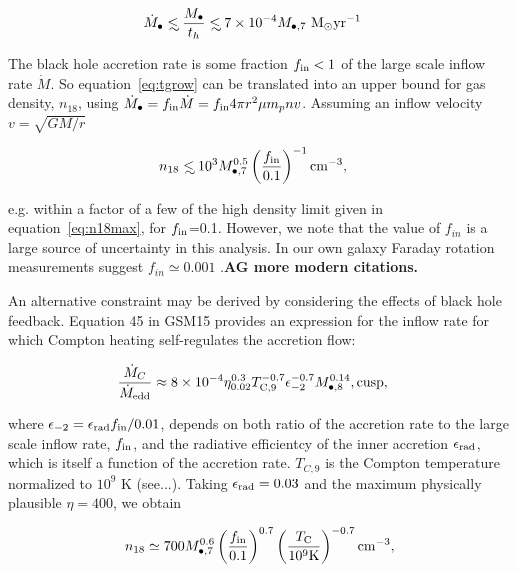 \documentclass[usenatbib,fleqn]{mnras}
\newcommand\lsim{\mathrel{\rlap{\lower4pt\hbox{\hskip1pt$\sim$}}
    \raise1pt\hbox{$<$}}}
\newcommand{\Mbh}[1][]{M_{\bullet#1}}
\newcommand{\Msun}{{\rm M_\odot}}
\newcommand{\pyear}{{\rm yr}^{-1}}
\begin{document}
\begin{align}
\dot{M}_{\bullet} &\lsim \frac{\Mbh}{t_h} \lsim 7 \times 10^{-4}
\Mbh[,7] \,\, \Msun \pyear
\label{eq:tgrow}
\end{align}

The black hole accretion rate is some fraction $f_{\rm in}<1$ of the
large scale inflow rate $\dot{M}$. So equation~\eqref{eq:tgrow} can be
translated into an upper bound for gas density, $n_{18}$, using
$\dot{M}_{\bullet} = f_{\rm in} \dot{M} = f_{\rm in} 4 \pi r^2 \mu m_p
n v$.  Assuming an inflow velocity $v=\sqrt{G M/r}$ 

\begin{align}
n_{18} &\lsim 10^3 \Mbh[,7]^{0.5} \left(\frac{f_{\rm in}}{0.1}\right)^{-1}
{\rm cm^{-3}}, 
\label{eq:tgrowDens}
\end{align}

e.g. within a factor of a few of the high density limit given in
equation~\eqref{eq:n18max}, for $f_{\rm in}$=0.1. However, we note
that the value of $f_{in}$ is a large source of uncertainty in this
analysis. In our own galaxy Faraday rotation measurements suggest
$f_{in}\simeq 0.001$ \citep{Quataert+2000}.{\bf AG more modern citations.}

An alternative constraint may be derived by considering the effects of
black hole feedback. Equation 45 in GSM15 provides an expression for
the inflow rate for which Compton heating self-regulates the accretion
flow:

\begin{align}
\frac{\dot{M}_{C}}{\dot{M}_{\rm edd}} \approx 
8\times 10^{-4} \eta_{0.02}^{0.3}T_{\rm
C,9}^{-0.7}\epsilon_{-2}^{-0.7} M_{\bullet,8}^{0.14}
&, \text{cusp}, 
  \label{eq:MdotCa}
\end{align}

where $\epsilon_{-2}=\epsilon_{\rm rad} f_{\rm in}/0.01$, depends on
both ratio of the accretion rate to the large scale inflow rate,
$f_{\rm in}$, and the radiative efficientcy of the inner accretion
$\epsilon_{\rm rad}$, which is itself a function of the accretion
rate. $T_{C,9}$ is the Compton temperature normalized to $10^9$
K (see...). Taking $\epsilon_{\rm rad}=0.03$ and the maximum physically
plausible $\eta=400$, we obtain

\begin{align}
n_{18} \simeq 700 \Mbh[,7]^{0.6} \left(\frac{f_{\rm
      in}}{0.1}\right)^{0.7} \left(\frac{T_{\rm C}}{10^9 {\rm
      K}}\right)^{-0.7} {\rm cm^{-3}},
\end{align}
\end{document}
